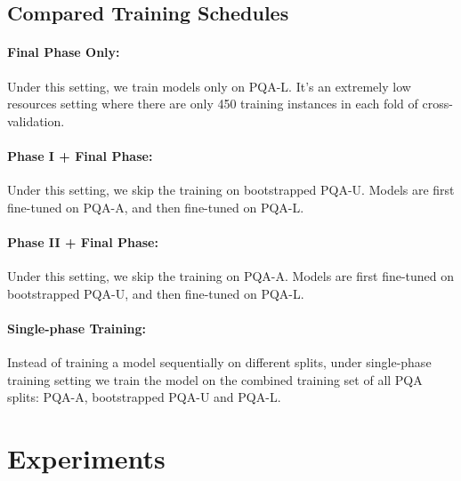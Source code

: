 \documentclass[11pt,a4paper]{article}
\begin{document}
\subsection{Compared Training Schedules}
\paragraph{Final Phase Only:}
Under this setting, we train models only on PQA-L. It's an extremely low resources setting where there are only 450 training instances in each fold of cross-validation.

\paragraph{Phase I + Final Phase:}
Under this setting, we skip the training on bootstrapped PQA-U. Models are first fine-tuned on PQA-A, and then fine-tuned on PQA-L.

\paragraph{Phase II + Final Phase:}
Under this setting, we skip the training on PQA-A. Models are first fine-tuned on bootstrapped PQA-U, and then fine-tuned on PQA-L. 

\paragraph{Single-phase Training:}
Instead of training a model sequentially on different splits, under single-phase training setting we train the model on the combined training set of all PQA splits: PQA-A, bootstrapped PQA-U and PQA-L.


\section{Experiments}
\end{document}
